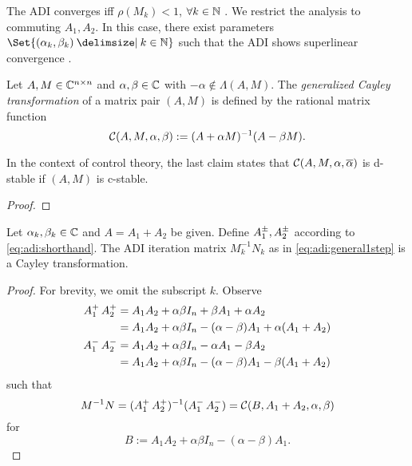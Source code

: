 The \ac{ADI} converges iff $\rho(M_k) < 1$, $\forall k\in\mathbb{N}$ \cite[Theorem~11.2.1]{Golub2013}.
We restrict the analysis to commuting $A_1, A_2$.
In this case,
there exist parameters $\Set{(\alpha_k, \beta_k) \given k\in\N}$
such that the \ac{ADI} shows
superlinear convergence \cite{Beckermann2010}.

\begin{lemma}
\label{thm:adi:cayley}
  Let $A, M\in\mathbb{C}^{n\times n}$ and $\alpha, \beta \in\mathbb{C}$ with $-\alpha\notin\Lambda(A, M)$.
  The \emph{generalized Cayley transformation} of a matrix pair $(A,M)$ is defined by
  the rational matrix function
  \begin{equation*}
    \mathcal{C}(A, M, \alpha, \beta) := (A+\alpha M)^{-1} (A-\beta M).
  \end{equation*}
\end{lemma}
\begin{remark}
  In the context of control theory,
  the last claim states that
  $\Cayley(A, M, \alpha, \conj\alpha)$ is d-stable if
  $(A, M)$ is c-stable.
\end{remark}
\begin{proof}
\end{proof}

\begin{lemma}
  Let $\alpha_k,\beta_k\in\mathbb{C}$ and $A=A_1+A_2$ be given.
  Define $\mathop{A_1^\pm}, \mathop{A_2^\pm}$ according to \eqref{eq:adi:shorthand}.
  The \ac{ADI} iteration matrix $M_k^{-1}N_k$ as in \eqref{eq:adi:general1step} is a Cayley transformation.
\end{lemma}
\begin{proof}
  For brevity, we omit the subscript $k$.
  Observe
  \begin{align*}
    \mathop{A_1^+}\mathop{A_2^+}
    &= A_1A_2 + \alpha\beta I_n + \beta A_1 + \alpha A_2 \\
    &= A_1A_2 + \alpha\beta I_n - (\alpha-\beta)A_1 + \alpha(A_1 + A_2) \\
    \mathop{A_1^-}\mathop{A_2^-}
    &= A_1A_2 + \alpha\beta I_n - \alpha A_1 - \beta A_2 \\
    &= A_1A_2 + \alpha\beta I_n - (\alpha-\beta)A_1 - \beta(A_1 + A_2)
  \end{align*}
  such that
  \begin{equation*}
    M^{-1}N
    = (\mathop{A_1^+}\mathop{A_2^+})^{-1}(\mathop{A_1^-}\mathop{A_2^-})
    = \mathcal{C}(B, A_1+A_2, \alpha, \beta)
  \end{equation*}
  for
  \begin{equation*}
    B := A_1A_2 + \alpha\beta I_n - (\alpha-\beta)A_1
    .
  \end{equation*}
\end{proof}


